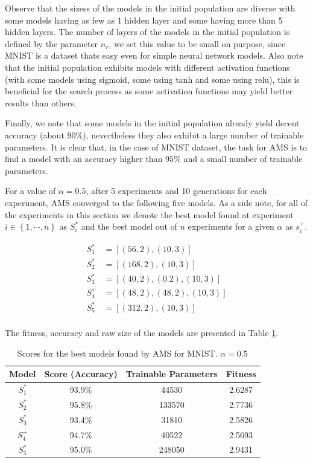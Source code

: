 \documentclass[journal]{IEEEtran}
\begin{document}
Observe that the sizess of the models in the initial population are diverse with some models having as few as 1 hidden layer and some having more than 5 hidden layers. The number of layers of the models in the initial population is defined by the parameter $n_r$, we set this value to be small on purpose, since MNIST is a dataset thats easy even for simple neural network models. Also note that the initial population exhibits models with different activation functions (with some models using sigmoid, some using tanh and some using relu), this is beneficial for the search process as some activation functions may yield better results than others.

Finally, we note that some models in the initial population already yield decent accuracy (about $90\%$), nevertheless they also exhibit a large number of trainable parameters. It is clear that, in the case of MNIST dataset, the task for AMS is to find a model with an accuracy higher than $95\%$ and a small number of trainable parameters.

For a value of $\alpha = 0.5$, after 5 experiments and 10 generations for each experiment, AMS converged to the following five models. As a side note, for all of the experiments in this section we denote the best model found at experiment $i \in \left\lbrace 1, \cdots, n \right\rbrace$ as $S_i^*$ and the best model out of $n$ experiments for a given $\alpha$ as $s_i^+$. 

\begin{align*}
S^*_1 & = \left[ (56, 2), (10, 3) \right] \\
S^*_2 & = \left[ (168, 2), (10, 3) \right] \\
S^*_3 & = \left[ (40, 2), (0.2), (10, 3) \right] \\
S^+_4& = \left[ (48, 2), (48, 2),  (10, 3) \right] \\
S^*_5 & = \left[ (312, 2), (10, 3) \right] \\
\end{align*}

The fitness, accuracy and raw size of the models are presented in Table \ref{table:autonn_mnist_1}.

\begin{table}[!htb]
\begin{center}
\begin{tabular}{| c | c | c | c |}
\hline
Model & Score (Accuracy) & Trainable Parameters & Fitness\\
\hline
$S^*_1$ & 93.9\% & 44530 & 2.6287\\
$S^*_2$ & 95.8\% & 133570 & 2.7736\\
$S^*_3$ & 93.4\% & 31810 & 2.5826\\
$S^+_4$ & 94.7\% & 40522 & 2.5693\\
$S^*_5$ & 95.0\% & 248050 & 2.9431\\
\hline
\end{tabular}
\end{center}
\caption{Scores for the best models found by AMS for MNIST. $\alpha = 0.5$}
\label{table:autonn_mnist_1}
\end{table}
\end{document}

